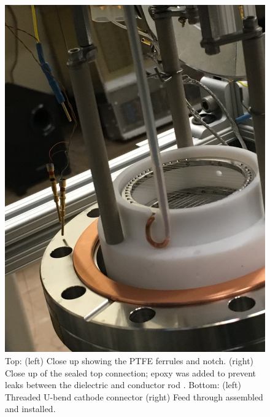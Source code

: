 \begin{figure}[htbp]
\begin{minipage}{0.47\textwidth}
    \includegraphics[width=\linewidth, angle=270]{figures/testbed/ft5_4.jpg}
    \end{minipage}
\caption{Top: (left) Close up showing the PTFE ferrules and notch. (right) Close up of the sealed top connection; epoxy was added to prevent leaks between the dielectric and conductor rod . Bottom: (left) Threaded U-bend cathode connector (right) Feed through assembled and installed.}
 \label{fig:ssrodft}
\end{figure}




